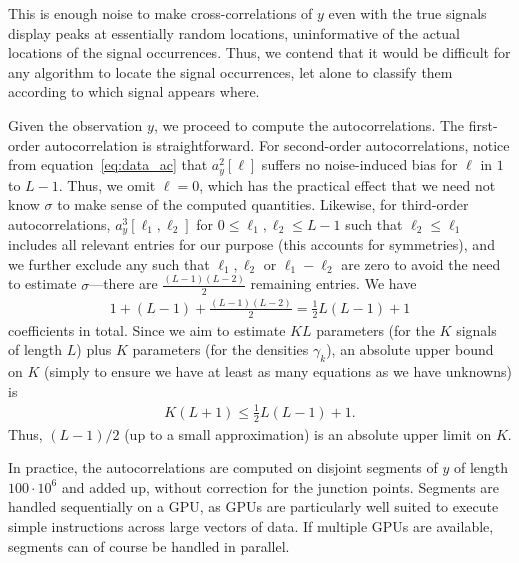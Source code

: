 \documentclass[english,11pt]{article}
\newcommand{\1}{\mathbf{1}}
\newcommand{\TODO}[1]{{\color{red}{[#1]}}}
\numberwithin{equation}{section}
\theoremstyle{plain}
\theoremstyle{definition}
\theoremstyle{remark}
\theoremstyle{plain}
\theoremstyle{remark}
\theoremstyle{plain}
\theoremstyle{plain}
\begin{document}
This is enough noise to make cross-correlations of $y$ even with the true signals display peaks at essentially random locations, uninformative of the actual locations of the signal occurrences. Thus, we contend that it would be difficult for any algorithm to locate the signal occurrences, let alone to classify them according to which signal appears where.

%
Given the observation $y$, we proceed to compute the autocorrelations. The first-order autocorrelation is straightforward. For second-order autocorrelations, notice from equation~\eqref{eq:data_ac} that $a_y^2[\ell]$ suffers no noise-induced bias for $\ell$ in $1$ to $L-1$. Thus, we omit $\ell = 0$, which has the practical effect that we need not know $\sigma$ to make sense of the computed quantities. Likewise, for third-order autocorrelations, $a_y^3[\ell_1, \ell_2]$ for $0 \leq \ell_1, \ell_2 \leq L-1$ such that $\ell_2 \leq \ell_1$ includes all relevant entries for our purpose (this accounts for symmetries), and we further exclude any such that $\ell_1, \ell_2$ or $\ell_1 - \ell_2$ are zero to avoid the need to estimate $\sigma$---there are $\frac{(L-1)(L-2)}{2}$ remaining entries. We have
\begin{align*}
1 + (L-1) + \frac{(L-1)(L-2)}{2} = \frac{1}{2} L (L-1) + 1
\end{align*}
coefficients in total. Since we aim to estimate $KL$ parameters (for the $K$ signals of length $L$) plus $K$ parameters (for the densities $\gamma_k$), an absolute upper bound on $K$ (simply to ensure we have at least as many equations as we have unknowns) is
\begin{align*}
K(L+1) \leq \frac{1}{2} L (L-1) + 1.
\end{align*}
Thus, $(L-1)/2$ (up to a small approximation) is an absolute upper limit on $K$. \TODO{We may want to cite MRA literature here.}

In practice, the autocorrelations are computed on disjoint segments of $y$ of length $100\cdot10^6$ and added up, without correction for the junction points. Segments are handled sequentially on a GPU, as GPUs are particularly well suited to execute simple instructions across large vectors of data. If multiple GPUs are available, segments can of course be handled in parallel.
\end{document}
